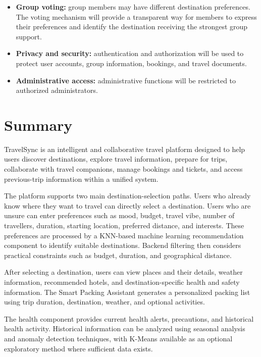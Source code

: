 \documentclass[11pt,a4paper]{article}
\begin{document}
\begin{itemize}
\item \textbf{Group voting:} group members may have different destination preferences. The voting mechanism will provide a transparent way for members to express their preferences and identify the destination receiving the strongest group support.

\item \textbf{Privacy and security:} authentication and authorization will be used to protect user accounts, group information, bookings, and travel documents.

\item \textbf{Administrative access:} administrative functions will be restricted to authorized administrators.

\end{itemize}



\section{Summary}

TravelSync is an intelligent and collaborative travel platform designed to help users discover destinations, explore travel information, prepare for trips, collaborate with travel companions, manage bookings and tickets, and access previous-trip information within a unified system.

The platform supports two main destination-selection paths. Users who already know where they want to travel can directly select a destination. Users who are unsure can enter preferences such as mood, budget, travel vibe, number of travellers, duration, starting location, preferred distance, and interests. These preferences are processed by a KNN-based machine learning recommendation component to identify suitable destinations. Backend filtering then considers practical constraints such as budget, duration, and geographical distance.

After selecting a destination, users can view places and their details, weather information, recommended hotels, and destination-specific health and safety information. The Smart Packing Assistant generates a personalized packing list using trip duration, destination, weather, and optional activities.

The health component provides current health alerts, precautions, and historical health activity. Historical information can be analyzed using seasonal analysis and anomaly detection techniques, with K-Means available as an optional exploratory method where sufficient data exists.
\end{document}
